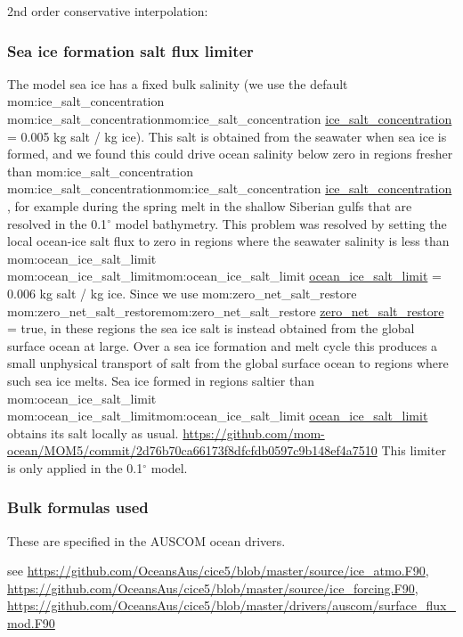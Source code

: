 \documentclass[11pt]{article}
\makeatletter
\newcommand{\TODO}[1]{\note{\textcolor{blue}{\textsf{\textbf{TODO: #1}}}}}
\newcommand*{\make@hex@label}[1]{%
  \def\hex@label{#1}%
  \@onelevel@sanitize\hex@label
  \EdefEscapeHex\hex@label{\hex@label}%
}
\newcommand*{\hexhyperlink}[2]{%
  \make@hex@label{#1}%
  \hyperlink{\hex@label}{#2}%
}
\newcommand{\momlink}[2]{\hexhyperlink{mom:#2}{#1}}
\newcommand{\param}[1]{\textsf{#1}}
\newcommand{\mom}[1]{\param{\momlink{#1}{#1}}}
\makeatother
\begin{document}
2nd order conservative interpolation:
\citet{KritsikisAechtnerMeurdesoifDubos2017a}

\subsubsection{Sea ice formation salt flux limiter}
The model sea ice has a fixed bulk salinity (we use the default \mom{ice_salt_concentration} = 0.005 kg salt / kg ice). 
This salt is obtained from the seawater when sea ice is formed, and we found this could drive ocean salinity below zero in regions fresher than \mom{ice_salt_concentration}, for example during the spring melt in the shallow Siberian gulfs that are resolved in the 0.1$^\circ$ model bathymetry.
This problem was resolved by setting the local ocean-ice salt flux to zero in regions where the seawater salinity is less than \mom{ocean_ice_salt_limit} = 0.006 kg salt / kg ice.
Since we use \mom{zero_net_salt_restore} = true, in these regions the sea ice salt is instead obtained from the global surface ocean at large.
Over a sea ice formation and melt cycle this produces a small unphysical transport of salt from the global surface ocean to regions where such sea ice melts.
Sea ice formed in regions saltier than \mom{ocean_ice_salt_limit} obtains its salt locally as usual.
\TODO{get Russ to check this} 
\url{https://github.com/mom-ocean/MOM5/commit/2d76b70ca66173f8dfcfdb0597c9b148ef4a7510}
This limiter is only applied in the 0.1$^\circ$ model.

\subsubsection{Bulk formulas used}
These are specified in the AUSCOM ocean drivers.

see \url{https://github.com/OceansAus/cice5/blob/master/source/ice_atmo.F90}, 
\url{https://github.com/OceansAus/cice5/blob/master/source/ice_forcing.F90},
\url{https://github.com/OceansAus/cice5/blob/master/drivers/auscom/surface_flux_mod.F90}
\end{document}
